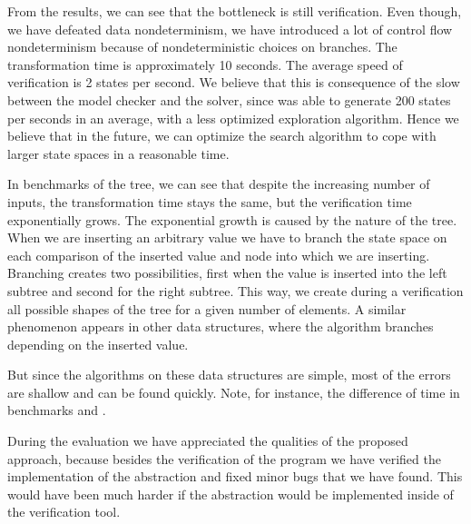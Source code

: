 From the results, we can see that the bottleneck is still verification. Even though,
we have defeated data nondeterminism, we have introduced a lot of control flow
nondeterminism because of nondeterministic choices on branches. The transformation
time is approximately 10 seconds. The average speed of verification is 2 states
per second. We believe that this is consequence of the slow \API between the model
checker and the \SMT solver, since \SymDIVINE was able to generate 200 states
per seconds in an average, with a less optimized exploration algorithm. Hence we
believe that in the future, we can optimize the search algorithm to cope with
larger state spaces in a reasonable time.

In benchmarks of the \AVL tree, we can see that despite the increasing number of
inputs, the transformation time stays the same, but the verification time
exponentially grows. The exponential growth is caused by the nature of the \AVL
tree. When we are inserting an arbitrary value we have to branch the state space
on each comparison of the inserted value and node into which we are inserting.
Branching creates two possibilities, first when the value is inserted into the
left subtree and second for the right subtree. This way, we create during a
verification all possible shapes of the \AVL tree for a given number of elements.
A similar phenomenon appears in other data structures, where the algorithm
branches depending on the inserted value.

But since the algorithms on these data structures are simple, most of the errors
are shallow and can be found quickly. Note, for instance, the difference of time
in benchmarks  and .

During the evaluation we have appreciated the qualities of the proposed
approach, because besides the verification of the program we have verified the
implementation of the abstraction and fixed minor bugs that we have found. This
would have been much harder if the abstraction would be implemented inside of the
verification tool.
